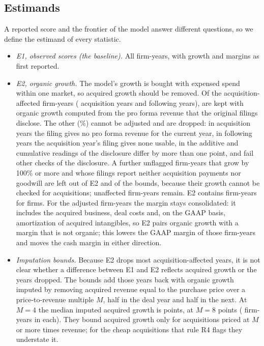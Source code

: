 \subsection{Estimands}\label{sec:data-estimands}
A reported score and the frontier of the model answer different questions, so we define the estimand of every statistic.
\begin{itemize}
\item \emph{E1, observed scores (the baseline).} All \VNEone{} firm-years, with growth and margins as first reported.
\item \emph{E2, organic growth.} The model's growth is bought with expensed spend within one market, so acquired growth should be removed. Of the \VAffected{} acquisition-affected firm-years (\VAffAcqYear{} acquisition years and \VAffFollow{} following years), \VAffKept{} are kept with organic growth computed from the pro forma revenue that the original filings disclose. The other \VAffDropped{} (\VAffDroppedShare\%) cannot be adjusted and are dropped: in \VDropNoPf{} acquisition years the filing gives no pro forma revenue for the current year, in \VDropFollow{} following years the acquisition year's filing gives none usable, in \VDropAmbig{} the additive and cumulative readings of the disclosure differ by more than one point, and \VDropOther{} fail other checks of the disclosure. A further \VUnverified{} unflagged firm-years that grow by 100\% or more and whose filings report neither acquisition payments nor goodwill are left out of E2 and of the bounds, because their growth cannot be checked for acquisitions; \VUnaffected{} unaffected firm-years remain. E2 contains \VNEtwo{} firm-years for \VFirmsEtwo{} firms. For the \VAffKept{} adjusted firm-years the margin stays consolidated: it includes the acquired business, deal costs and, on the GAAP basis, amortization of acquired intangibles, so E2 pairs organic growth with a margin that is not organic; this lowers the GAAP margin of those firm-years and moves the cash margin in either direction.
\item \emph{Imputation bounds.} Because E2 drops most acquisition-affected years, it is not clear whether a difference between E1 and E2 reflects acquired growth or the years dropped. The bounds add those years back with organic growth imputed by removing acquired revenue equal to the purchase price over a price-to-revenue multiple $M$, half in the deal year and half in the next. At $M=4$ the median imputed acquired growth is \VImpFourAcq{} points, at $M=8$ \VImpEightAcq{} points (\VNImp{} firm-years in each). They bound acquired growth only for acquisitions priced at $M$ or more times revenue; for the cheap acquisitions that rule R4 flags they understate it.
\end{itemize}

